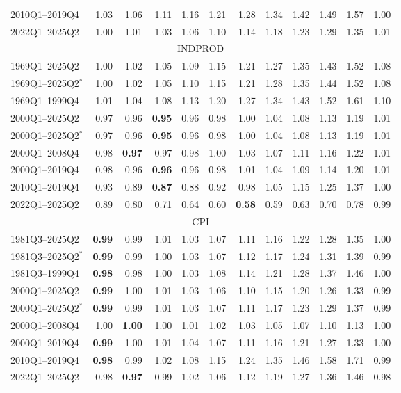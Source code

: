 \begin{tabular}{lrrrrrrrrrrr}
2010Q1--2019Q4 & 1.03 & 1.06 & 1.11 & 1.16 & 1.21 & 1.28 & 1.34 & 1.42 & 1.49 & 1.57 & 1.00 \\
2022Q1--2025Q2 & 1.00 & 1.01 & 1.03 & 1.06 & 1.10 & 1.14 & 1.18 & 1.23 & 1.29 & 1.35 & 1.01 \\
\hline
\multicolumn{12}{c}{INDPROD} \\
1969Q1--2025Q2 & 1.00 & 1.02 & 1.05 & 1.09 & 1.15 & 1.21 & 1.27 & 1.35 & 1.43 & 1.52 & 1.08 \\
1969Q1--2025Q2$^*$ & 1.00 & 1.02 & 1.05 & 1.10 & 1.15 & 1.21 & 1.28 & 1.35 & 1.44 & 1.52 & 1.08 \\
1969Q1--1999Q4 & 1.01 & 1.04 & 1.08 & 1.13 & 1.20 & 1.27 & 1.34 & 1.43 & 1.52 & 1.61 & 1.10 \\
2000Q1--2025Q2 & 0.97 & 0.96 & \textbf{0.95} & 0.96 & 0.98 & 1.00 & 1.04 & 1.08 & 1.13 & 1.19 & 1.01 \\
2000Q1--2025Q2$^*$ & 0.97 & 0.96 & \textbf{0.95} & 0.96 & 0.98 & 1.00 & 1.04 & 1.08 & 1.13 & 1.19 & 1.01 \\
2000Q1--2008Q4 & 0.98 & \textbf{0.97} & 0.97 & 0.98 & 1.00 & 1.03 & 1.07 & 1.11 & 1.16 & 1.22 & 1.01 \\
2000Q1--2019Q4 & 0.98 & 0.96 & \textbf{0.96} & 0.96 & 0.98 & 1.01 & 1.04 & 1.09 & 1.14 & 1.20 & 1.01 \\
2010Q1--2019Q4 & 0.93 & 0.89 & \textbf{0.87} & 0.88 & 0.92 & 0.98 & 1.05 & 1.15 & 1.25 & 1.37 & 1.00 \\
2022Q1--2025Q2 & 0.89 & 0.80 & 0.71 & 0.64 & 0.60 & \textbf{0.58} & 0.59 & 0.63 & 0.70 & 0.78 & 0.99 \\
\hline
\multicolumn{12}{c}{CPI} \\
1981Q3--2025Q2 & \textbf{0.99} & 0.99 & 1.01 & 1.03 & 1.07 & 1.11 & 1.16 & 1.22 & 1.28 & 1.35 & 1.00 \\
1981Q3--2025Q2$^*$ & \textbf{0.99} & 0.99 & 1.00 & 1.03 & 1.07 & 1.12 & 1.17 & 1.24 & 1.31 & 1.39 & 0.99 \\
1981Q3--1999Q4 & \textbf{0.98} & 0.98 & 1.00 & 1.03 & 1.08 & 1.14 & 1.21 & 1.28 & 1.37 & 1.46 & 1.00 \\
2000Q1--2025Q2 & \textbf{0.99} & 1.00 & 1.01 & 1.03 & 1.06 & 1.10 & 1.15 & 1.20 & 1.26 & 1.33 & 0.99 \\
2000Q1--2025Q2$^*$ & \textbf{0.99} & 0.99 & 1.01 & 1.03 & 1.07 & 1.11 & 1.17 & 1.23 & 1.29 & 1.37 & 0.99 \\
2000Q1--2008Q4 & 1.00 & \textbf{1.00} & 1.00 & 1.01 & 1.02 & 1.03 & 1.05 & 1.07 & 1.10 & 1.13 & 1.00 \\
2000Q1--2019Q4 & \textbf{0.99} & 1.00 & 1.01 & 1.04 & 1.07 & 1.11 & 1.16 & 1.21 & 1.27 & 1.33 & 1.00 \\
2010Q1--2019Q4 & \textbf{0.98} & 0.99 & 1.02 & 1.08 & 1.15 & 1.24 & 1.35 & 1.46 & 1.58 & 1.71 & 0.99 \\
2022Q1--2025Q2 & 0.98 & \textbf{0.97} & 0.99 & 1.02 & 1.06 & 1.12 & 1.19 & 1.27 & 1.36 & 1.46 & 0.98 \\
\hline
\end{tabular}
